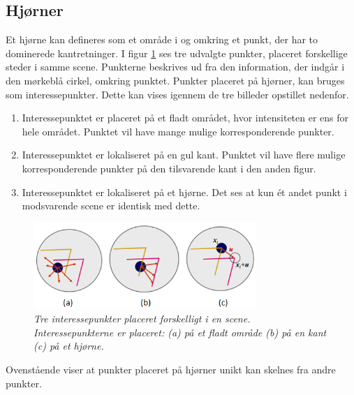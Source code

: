 \subsection*{Hjørner}\label{subsec:corner}
Et hjørne kan defineres som et område i og omkring et punkt, der har to dominerede kantretninger. I figur \ref{app} ses tre udvalgte punkter, placeret forskellige steder i samme scene. Punkterne beskrives ud fra den information, der indgår i den mørkeblå cirkel, omkring punktet. Punkter placeret på hjørner, kan bruges som interessepunkter. Dette kan vises igennem de tre billeder opstillet nedenfor.
\begin{enumerate}[label=\alph*]
\item{Interessepunktet er placeret på et fladt området, hvor intensiteten er ens for hele området. Punktet vil have mange mulige korresponderende punkter.}
\item{Interessepunktet er lokaliseret på en gul kant. Punktet vil have flere mulige korresponderende punkter på den tilsvarende kant i den anden figur.}
\item{Interessepunktet er lokaliseret på et hjørne. Det ses at kun ét andet punkt i modsvarende scene er identisk med dette.}
\end{enumerate}
\begin{figure}[H]
    \centering
    \includegraphics[width=0.75\textwidth]{fig/37.png}
    \vspace{-1em}   
    \begin{center}    
    \caption{{\footnotesize \textit{Tre interessepunkter placeret forskelligt i en scene. Interessepunkterne er placeret: (a) på et fladt område (b) på en kant (c) på et hjørne. 
 }}}
    \label{app}
     \end{center}
    \vspace{-2.7em}  
  \end{figure}  
\noindent
Ovenstående viser at punkter placeret på hjørner unikt kan skelnes fra andre punkter. 